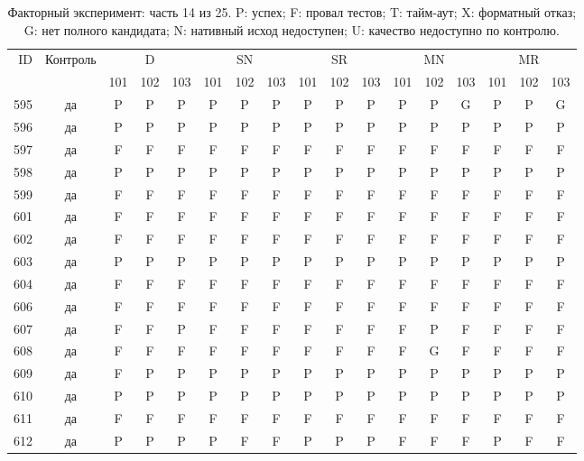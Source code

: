 \begin{table}[p]\centering\footnotesize
\setlength{\tabcolsep}{3pt}
\caption{Факторный эксперимент: часть 14 из 25. P: успех; F: провал тестов; T: тайм-аут; X: форматный отказ; G: нет полного кандидата; N: нативный исход недоступен; U: качество недоступно по контролю.}
\begin{tabular*}{\textwidth}{@{\extracolsep{\fill}}rcccccccccccccccc}\toprule
ID & Контроль & \multicolumn{3}{c}{D} & \multicolumn{3}{c}{SN} & \multicolumn{3}{c}{SR} & \multicolumn{3}{c}{MN} & \multicolumn{3}{c}{MR}\\
\cmidrule(lr){3-5}\cmidrule(lr){6-8}\cmidrule(lr){9-11}\cmidrule(lr){12-14}\cmidrule(lr){15-17}
 & & 101 & 102 & 103 & 101 & 102 & 103 & 101 & 102 & 103 & 101 & 102 & 103 & 101 & 102 & 103\\\midrule
595 & да & P & P & P & P & P & P & P & P & P & P & P & G & P & P & G\\
596 & да & P & P & P & P & P & P & P & P & P & P & P & P & P & P & P\\
597 & да & F & F & F & F & F & F & F & F & F & F & F & F & F & F & F\\
598 & да & P & P & P & P & P & P & P & P & P & P & P & P & P & P & P\\
599 & да & F & F & F & F & F & F & F & F & F & F & F & F & F & F & F\\
601 & да & F & F & F & F & F & F & F & F & F & F & F & F & F & F & F\\
602 & да & F & F & F & F & F & F & F & F & F & F & F & F & F & F & F\\
603 & да & P & P & P & P & P & P & P & P & P & P & P & P & P & P & P\\
604 & да & F & F & F & F & F & F & F & F & F & F & F & F & F & F & F\\
606 & да & F & F & F & F & F & F & F & F & F & F & F & F & F & F & F\\
607 & да & F & F & P & F & F & F & F & F & F & F & P & F & F & F & F\\
608 & да & F & F & F & F & F & F & F & F & F & F & G & F & F & F & F\\
609 & да & F & P & P & P & P & P & P & P & P & P & P & P & P & P & P\\
610 & да & P & P & P & P & P & P & P & P & P & P & P & P & P & P & P\\
611 & да & F & F & F & F & F & F & F & F & F & F & F & F & F & F & F\\
612 & да & P & P & P & P & F & F & P & P & P & F & F & F & P & F & F\\

\end{tabular*}
\end{table}
